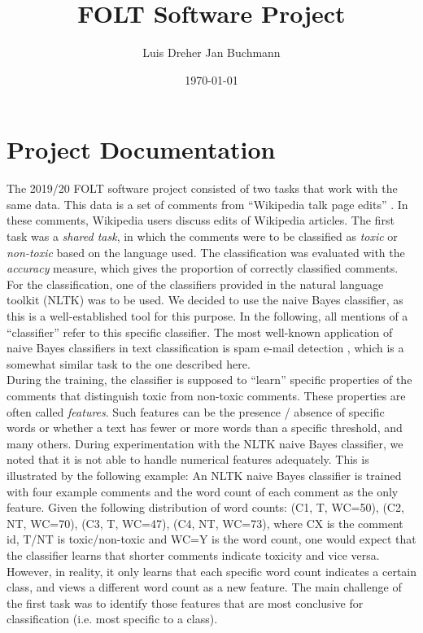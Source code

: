 \documentclass[11pt,a4paper]{article}
\title{FOLT Software Project}
\author{Luis Dreher \And Jan Buchmann}
\date{\today}
\begin{document}
\maketitle


\section{Project Documentation}
The 2019/20 FOLT software project consisted of two tasks that work with the same data. This data is a set of comments from ``Wikipedia talk page edits'' \cite{taskdescription}. In these comments, Wikipedia users discuss edits of Wikipedia articles. The first task was a \textit{shared task}, in which the comments were to be classified as \textit{toxic} or \textit{non-toxic} based on the language used. The classification was evaluated with the \textit{accuracy} measure, which gives the proportion of correctly classified comments. \\
For the classification, one of the classifiers provided in the natural language toolkit (NLTK) \citep{nltkbook} was to be used. We decided to use the naive Bayes classifier, as this is a well-established tool for this purpose. In the following, all mentions of a ``classifier'' refer to this specific classifier. The most well-known application of naive Bayes classifiers in text classification is spam e-mail detection \cite{naivebayesspam}, which is a somewhat similar task to the one described here. \\
During the training, the classifier is supposed to ``learn'' specific properties of the comments that distinguish toxic from non-toxic comments. These properties are often called \textit{features}. Such features can be the presence / absence of specific words or whether a text has fewer or more words than a specific threshold, and many others. During experimentation with the NLTK naive Bayes classifier, we noted that it is not able to handle numerical features adequately. This is illustrated by the following example: An NLTK naive Bayes classifier is trained with four example comments and the word count of each comment as the only feature. Given the following distribution of word counts: (C1, T, WC=50), (C2, NT, WC=70), (C3, T, WC=47), (C4, NT, WC=73), where CX is the comment id, T/NT is toxic/non-toxic and WC=Y is the word count, one would expect that the classifier learns that shorter comments indicate toxicity and vice versa. However, in reality, it only learns that each specific word count indicates a certain class, and views a different word count as a new feature. The main challenge of the first task was to identify those features that are most conclusive for classification (i.e. most specific to a class). \\
\end{document}
